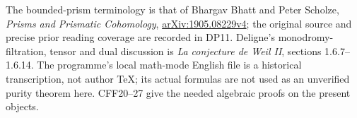 The bounded-prism terminology is that of Bhargav Bhatt
and Peter Scholze, \emph{Prisms and Prismatic Cohomology},
\href{https://arxiv.org/abs/1905.08229}{arXiv:1905.08229v4};
the original source and precise prior reading coverage are
recorded in DP11. Deligne's monodromy-filtration, tensor
and dual discussion is \emph{La conjecture de Weil II},
sections 1.6.7--1.6.14. The programme's local math-mode
English file is a historical transcription, not author
TeX; its actual formulas are not used as an unverified
purity theorem here. CFF20--27 give the needed algebraic
proofs on the present objects.
